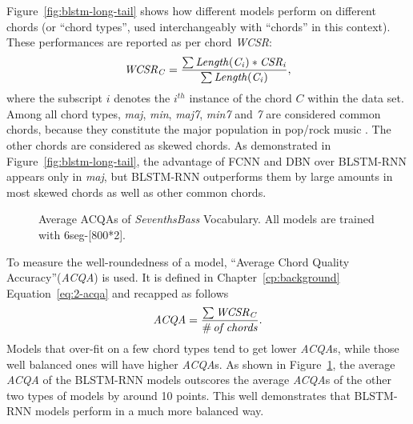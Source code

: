 Figure~\ref{fig:blstm-long-tail} shows how different models perform on different chords (or ``chord types'', used interchangeably with ``chords'' in this context). These performances are reported as per chord \textit{WCSR}:
\begin{equation}
	\mathit{WCSR_{C} = {\sum{Length(C_i)*CSR_i} \over \sum{Length(C_i)}}},
	\label{eq:wcsrchord}
\end{equation}
where the subscript $i$ denotes the $i^{th}$ instance of the chord $C$ within the data set. Among all chord types, \textit{maj}, \textit{min}, \textit{maj7}, \textit{min7} and \textit{7} are considered common chords, because they constitute the major population in pop/rock music \cite{burgoyne2011expert}. The other chords are considered as skewed chords. As demonstrated in Figure~\ref{fig:blstm-long-tail}, the advantage of FCNN and DBN over BLSTM-RNN appears only in \textit{maj}, but BLSTM-RNN outperforms them by large amounts in most skewed chords as well as other common chords.

\begin{figure}[htb]
	\centering
	\caption{Average ACQAs of \textit{SeventhsBass} Vocabulary. All models are trained with 6seg-[800*2].}
	\label{fig:acqa}
\end{figure}

To measure the well-roundedness of a model, ``Average Chord Quality Accuracy''(\textit{ACQA}) \cite{cho2014improved} is used. It is defined in Chapter~\ref{cp:background} Equation~\ref{eq:2-acqa} and recapped as follows
\begin{equation}
	\mathit{ACQA = {{\sum{WCSR_{C}}} \over {\#\,of\,chords}}}.
	\label{eq:3-acqa}
\end{equation}
Models that over-fit on a few chord types tend to get lower \textit{ACQA}s, while those well balanced ones will have higher \textit{ACQA}s. As shown in Figure~\ref{fig:acqa}, the average \textit{ACQA} of the BLSTM-RNN models outscores the average \textit{ACQA}s of the other two types of models by around 10 points. This well demonstrates that BLSTM-RNN models perform in a much more balanced way.

